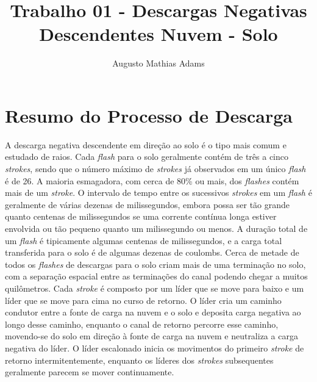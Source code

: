 \documentclass[a4paper, 12pt, onecolumn,singlespacing]{article}
\title{Trabalho 01 - Descargas Negativas Descendentes Nuvem - Solo}
\author[1]{Augusto Mathias Adams}
\affil[1]{augusto.adams@ufpr.br}
\begin{document}
	
	\maketitle

	\section{Resumo do Processo de Descarga}
	A descarga negativa descendente em direção ao solo é o tipo mais comum e estudado de raios. Cada \textit{flash} para o solo geralmente contém de três a cinco \textit{strokes}, sendo que o número máximo de \textit{strokes} já observados em um único \textit{flash} é de 26. A maioria esmagadora, com cerca de 80\% ou mais, dos \textit{flashes} contém mais de um \textit{stroke}. O intervalo de tempo entre os sucessivos \textit{strokes} em um \textit{flash} é geralmente de várias dezenas de milissegundos, embora possa ser tão grande quanto centenas de milissegundos se uma corrente contínua longa estiver envolvida ou tão pequeno quanto um milissegundo ou menos. A duração total de um \textit{flash} é tipicamente algumas centenas de milissegundos, e a carga total transferida para o solo é de algumas dezenas de coulombs. Cerca de metade de todos os \textit{flashes} de descargas para o solo criam mais de uma terminação no solo, com a separação espacial entre as terminações do canal podendo chegar a muitos quilômetros. Cada \textit{stroke} é composto por um líder que se move para baixo e um líder que se move para cima no curso de retorno. O líder cria um caminho condutor entre a fonte de carga na nuvem e o solo e deposita carga negativa ao longo desse caminho, enquanto o canal de retorno percorre esse caminho, movendo-se do solo em direção à fonte de carga na nuvem e neutraliza a carga negativa do líder. O líder escalonado inicia os movimentos do primeiro \textit{stroke} de retorno intermitentemente, enquanto os líderes dos \textit{strokes} subsequentes geralmente parecem se mover continuamente.
	
\end{document}

